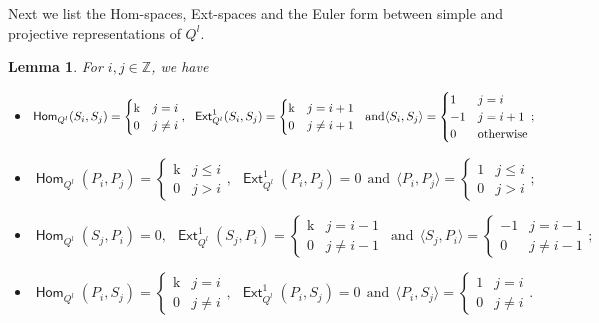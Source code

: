 \documentclass[reqno,12pt,a4paper]{amsart}
\newtheorem{lemma}[theorem]{Lemma}
\theoremstyle{remark}
\theoremstyle{definition}
\newcommand{\opname}[1]{\operatorname{\mathsf{#1}}}
\newcommand{\Hom}{\opname{Hom}}
\newcommand{\Ext}{\opname{Ext}}
\newcommand{\fk}{{\mathrm k}}
\numberwithin{equation}{section}
\begin{document}
\smallskip
Next we list the Hom-spaces, Ext-spaces and the Euler form between simple and projective representations of $Q^l$.


\begin{lemma}
	\label{lem:Euler-form-linear}
	For $i,j\in\mathbb{Z}$, we have
	
	\begin{itemize}
		\item[(1)] $\Hom_{Q^l}(S_i,S_j)=\begin{cases} \fk & j=i\\ 0 &j\neq i\end{cases},~~\Ext^1_{Q^l}(S_i,S_j)=\begin{cases} \fk & j=i+1\\ 0 & j\neq i+1\end{cases}~~\text{and}\\\langle S_i,S_j\rangle=\begin{cases} 1 & j=i\\ -1 & j=i+1\\ 0 &\text{otherwise}\end{cases};$
		\item[(2)] $
		\Hom_{Q^l}(P_i,P_j)=\begin{cases} \fk & j\leq i\\ 0 &j> i\end{cases},~~\Ext^1_{Q^l}(P_i,P_j)=0~~\text{and}~~\langle P_i,P_j\rangle=\begin{cases} 1 & j\leq i\\ 0 &j>i\end{cases};$
		\item[(3)] $	\Hom_{Q^l}(S_j,P_i)=0,~~\Ext^1_{Q^l}(S_j,P_i)=\begin{cases} \fk & j=i-1\\ 0 & j\neq i-1\end{cases}~~\text{and}~~\langle S_j, P_i\rangle=\begin{cases} -1 & j=i-1\\ 0 & j\neq i-1\end{cases};$
		\item[(4)] $
		\Hom_{Q^l}(P_i,S_j)=\begin{cases} \fk & j=i\\ 0 &j\neq i\end{cases},~~\Ext^1_{Q^l}(P_i,S_j)=0~~\text{and}~~\langle P_i,S_j\rangle=\begin{cases} 1 & j=i\\ 0 &j\neq i\end{cases}.$
		
	\end{itemize}
\end{lemma}
\end{document}
